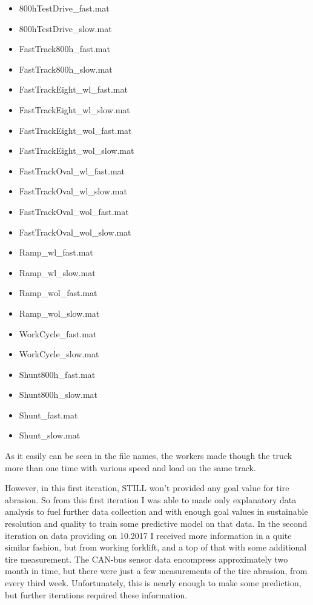 \begin{itemize}[noitemsep]
    \item {800hTestDrive\_fast.mat}
    \item {800hTestDrive\_slow.mat}
    \item {FastTrack800h\_fast.mat}
 	\item {FastTrack800h\_slow.mat}
	\item {FastTrackEight\_wl\_fast.mat}
	\item {FastTrackEight\_wl\_slow.mat}
	\item {FastTrackEight\_wol\_fast.mat}
	\item {FastTrackEight\_wol\_slow.mat}
  	\item {FastTrackOval\_wl\_fast.mat}
	\item {FastTrackOval\_wl\_slow.mat}
	\item {FastTrackOval\_wol\_fast.mat}
	\item {FastTrackOval\_wol\_slow.mat}
	\item {Ramp\_wl\_fast.mat} 
	\item {Ramp\_wl\_slow.mat}
	\item {Ramp\_wol\_fast.mat}
	\item {Ramp\_wol\_slow.mat}
    \item {WorkCycle\_fast.mat}
    \item {WorkCycle\_slow.mat}
	\item {Shunt800h\_fast.mat}  	
  	\item {Shunt800h\_slow.mat}	
 	\item {Shunt\_fast.mat} 	
 	\item {Shunt\_slow.mat}
\end{itemize}

				\noindent
As it easily can be seen in the file names, the workers made though the truck more than one time with various speed and load on the same track.

However, in this first iteration, STILL won't provided any goal value for tire abrasion. So from this first iteration I was able to made only explanatory data analysis to fuel further data collection and with enough goal values in sustainable resolution and quality to train some predictive model on that data.
				\noindent
In the second iteration on data providing on 10.2017 I received more information in a quite similar fashion, but from working forklift, and a top of that with some additional tire measurement. The CAN-bus sensor data encompress approximately two month in time, but there were just a few measurements of the tire abrasion, from every third week. Unfortunately, this is nearly enough to make some prediction, but further iterations required these information.

